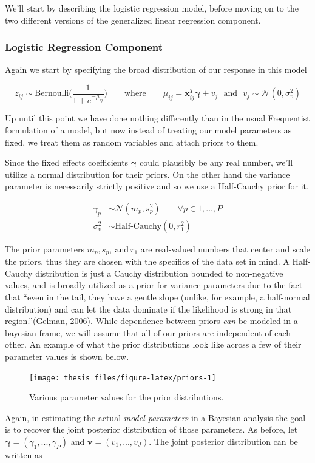 \documentclass[12pt,twoside]{reedthesis}
\begin{document}
We'll start by describing the logistic regression model, before moving on to the two different versions of the generalized linear regression component.

\hypertarget{bayeslog}{%
\subsubsection{Logistic Regression Component}\label{bayeslog}}

Again we start by specifying the broad distribution of our response in this model

\[
z_{ij} \sim \text{Bernoulli}\Bigg(\frac{1}{1 + e^{-\mu_{ij}}}\Bigg) \qquad \text{where} \qquad \mu_{ij} =\mathbf{x}_{ij}^T\boldsymbol{\gamma} + v_j \ \ \ \text{and} \ \ \ v_j  \sim \mathcal{N}(0, \sigma_{v}^2)
\]

Up until this point we have done nothing differently than in the usual Frequentist formulation of a model, but now instead of treating our model parameters as fixed, we treat them as random variables and attach priors to them.

Since the fixed effects coefficients \(\boldsymbol{\gamma}\) could plausibly be any real number, we'll utilize a normal distribution for their priors. On the other hand the variance parameter is necessarily strictly positive and so we use a Half-Cauchy prior for it.

\[
\begin{aligned}
\gamma_p &\sim \mathcal{N}(m_p, s_p^2)  \qquad \forall p\in 1, ...,P \\
\sigma_{v}^2 &\sim \text{Half-Cauchy}(0, r_1^2)
\end{aligned}
\]

The prior parameters \(m_p, s_p, \ \text{and} \ r_1\) are real-valued numbers that center and scale the priors, thus they are chosen with the specifics of the data set in mind. A Half-Cauchy distribution is just a Cauchy distribution bounded to non-negative values, and is broadly utilized as a prior for variance parameters due to the fact that ``even in the tail, they have a gentle slope (unlike, for example, a half-normal distribution) and can let the data dominate if the likelihood is strong in that region.''(Gelman, 2006). While dependence between priors \emph{can} be modeled in a bayesian frame, we will assume that all of our priors are independent of each other. An example of what the prior distributions look like across a few of their parameter values is shown below.
\begin{figure}

{\centering \texttt{[image: thesis\_files/figure-latex/priors-1]} 

}

\caption{Various parameter values for the prior distributions.}\label{fig:priors}
\end{figure}
Again, in estimating the actual \emph{model parameters} in a Bayesian analysis the goal is to recover the joint posterior distribution of those parameters. As before, let \(\boldsymbol{\gamma} = (\gamma_1, ...,\gamma_P)\) and \(\mathbf{v} = (v_1, ..., v_J)\). The joint posterior distribution can be written as
\end{document}
